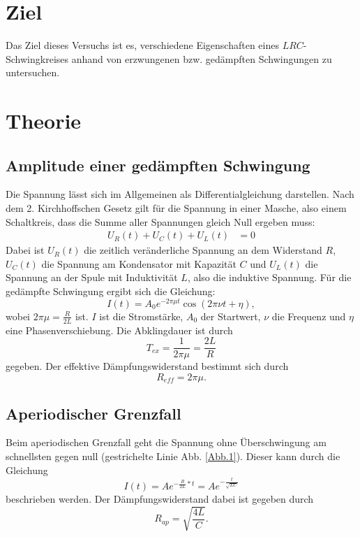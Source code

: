 \section{Ziel}
Das Ziel dieses Versuchs ist es, verschiedene Eigenschaften eines $LRC$-Schwingkreises
anhand von erzwungenen bzw. gedämpften Schwingungen zu untersuchen.

\section{Theorie}
\label{sec:Theorie}
\cite{V354}

\subsection{Amplitude einer gedämpften Schwingung}
Die Spannung lässt sich im Allgemeinen als Differentialgleichung darstellen.
Nach dem 2. Kirchhoffschen Gesetz gilt für die Spannung in einer Masche,
also einem Schaltkreis, dass die Summe aller Spannungen gleich Null ergeben muss:
\begin{align*}
    U_{R}(t)+U_{C}(t)+U_{L}(t) &= 0 
\end{align*}
Dabei ist $U_{R}(t)$ die zeitlich veränderliche Spannung an dem Widerstand $R$,
$U_{C}(t)$ die Spannung am Kondensator mit Kapazität $C$ und $U_{L}(t)$ die Spannung
an der Spule mit Induktivität $L$, also die induktive Spannung.
Für die gedämpfte Schwingung ergibt sich die Gleichung:
\begin{equation}
    I(t)= A_{0} e^{-2 \pi \mu t} \cos(2 \pi \nu t + \eta),
\end{equation}
wobei $2 \pi \mu = \frac{R}{2L}$ ist. $I$ ist die Stromstärke, $A_{0}$ der Startwert,
$\nu$ die Frequenz und $\eta$ eine Phasenverschiebung.
Die Abklingdauer ist durch
\begin{equation}
    T_{ex} = \frac{1}{2 \pi \mu} = \frac{2L}{R}
    \label{eqn:t_ex}
\end{equation}
gegeben.
Der effektive Dämpfungswiderstand bestimmt sich durch
\begin{equation}
    R_{eff} = 2 \pi \mu. %
\end{equation}

\subsection{Aperiodischer Grenzfall}
Beim aperiodischen Grenzfall geht die Spannung ohne Überschwingung am schnellsten gegen null
(gestrichelte Linie Abb. \ref{Abb.1}). Dieser kann durch die Gleichung
\begin{equation} 
    I(t)=A e^{-\frac{R}{2L}*t}= A e^{-\frac{t}{\sqrt{LC}}}
\end{equation}
beschrieben werden.
Der Dämpfungswiderstand dabei ist gegeben durch
\begin{equation}
    R_{ap} = \sqrt{\frac{4L}{C}}.
    \label{eqn:r_ap}
\end{equation}

